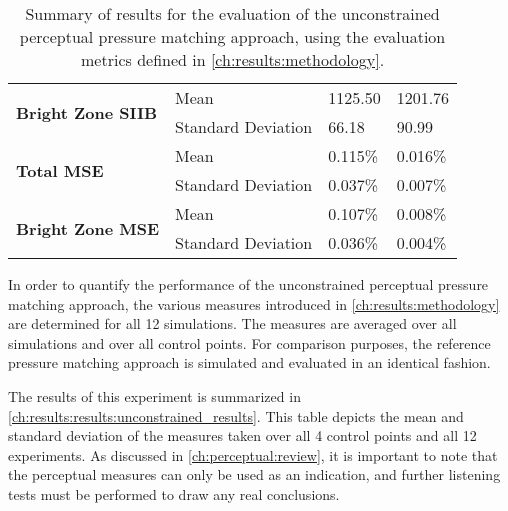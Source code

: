 \begin{table}[]
\begin{tabular}{|l|l|l|l|}
\multirow{2}{*}{\textbf{Bright Zone SIIB}}  & Mean               & 1125.50                           & 1201.76            \\
                                            & Standard Deviation & 66.18                             & 90.99              \\ \hline
\multirow{2}{*}{\textbf{Total MSE}}         & Mean               & 0.115\%                           & 0.016\%            \\
                                            & Standard Deviation & 0.037\%                           & 0.007\%            \\ \hline
\multirow{2}{*}{\textbf{Bright Zone MSE}}   & Mean               & 0.107\%                           & 0.008\%            \\
                                            & Standard Deviation & 0.036\%                           & 0.004\%            \\ \hline
\end{tabular}
\caption{
    Summary of results for the evaluation of the unconstrained perceptual pressure matching approach,
    using the evaluation metrics defined in \autoref{ch:results:methodology}.
}
\label{ch:results:results:unconstrained_results}
\end{table}

In order to quantify the performance of the unconstrained perceptual pressure matching approach, the various 
measures introduced in \autoref{ch:results:methodology} are determined for all 12 simulations.
The measures are averaged over all simulations and over all control points.
For comparison purposes, the reference pressure matching approach  is 
simulated and evaluated in an identical fashion.

The results of this experiment is summarized in \autoref{ch:results:results:unconstrained_results}.
This table depicts the mean and standard deviation of the measures taken over all 4 control points and all 12 experiments.
As discussed in \autoref{ch:perceptual:review}, it is important to note that the perceptual measures can only
be used as an indication, and further listening tests must be performed to draw any real conclusions.

